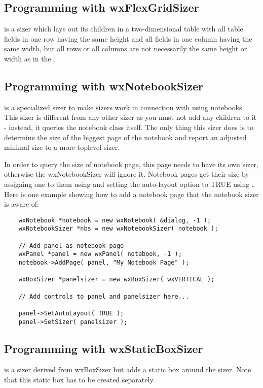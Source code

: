 \subsection{Programming with wxFlexGridSizer}\label{flexgridsizerprogramming}

 is a sizer which lays out its children in a two-dimensional
table with all table fields in one row having the same
height and all fields in one column having the same width, but all
rows or all columns are not necessarily the same height or width as in
the .

\subsection{Programming with wxNotebookSizer}\label{notebooksizerprogramming}

 is a specialized sizer to make sizers work in connection
with using notebooks. This sizer is different from any other sizer as 
you must not add any children to it - instead, it queries the notebook class itself.
The only thing this sizer does is to determine the size of the biggest
page of the notebook and report an adjusted minimal size to a more toplevel
sizer.

In order to query the size of notebook page, this page needs to have its
own sizer, otherwise the wxNotebookSizer will ignore it. Notebook pages
get their size by assigning one to them using  
and setting the auto-layout option to TRUE using 
. Here is one
example showing how to add a notebook page that the notebook sizer is
aware of:

\begin{verbatim}
    wxNotebook *notebook = new wxNotebook( &dialog, -1 );
    wxNotebookSizer *nbs = new wxNotebookSizer( notebook );

    // Add panel as notebook page
    wxPanel *panel = new wxPanel( notebook, -1 );
    notebook->AddPage( panel, "My Notebook Page" );

    wxBoxSizer *panelsizer = new wxBoxSizer( wxVERTICAL );

    // Add controls to panel and panelsizer here...

    panel->SetAutoLayout( TRUE );
    panel->SetSizer( panelsizer );
\end{verbatim}

\subsection{Programming with wxStaticBoxSizer}\label{staticboxsizerprogramming}

 is a sizer derived from wxBoxSizer but adds a static
box around the sizer. Note that this static box has to be created 
separately.

